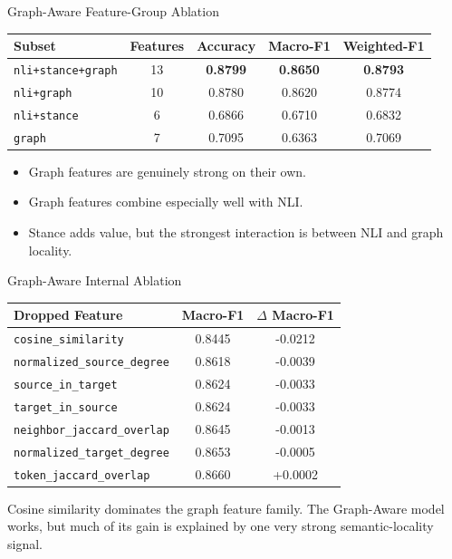 \documentclass[aspectratio=169, 10pt]{beamer}
\newcommand{\takeawaybox}[2]{%
  \begin{tcolorbox}[colback=accentgreen!10, colframe=accentgreen,
    title={\textbf{Takeaway:} #1}, fonttitle=\bfseries\small,
    left=4pt, right=4pt, top=3pt, bottom=3pt, boxrule=1pt]
    \small #2
  \end{tcolorbox}}
\begin{document}
\begin{frame}{Graph-Aware Feature-Group Ablation}
\begin{center}
\begin{tabular}{lcccc}
\toprule
Subset & Features & Accuracy & Macro-F1 & Weighted-F1 \\
\midrule
\texttt{nli+stance+graph} & 13 & \textbf{0.8799} & \textbf{0.8650} & \textbf{0.8793} \\
\texttt{nli+graph} & 10 & 0.8780 & 0.8620 & 0.8774 \\
\texttt{nli+stance} & 6 & 0.6866 & 0.6710 & 0.6832 \\
\texttt{graph} & 7 & 0.7095 & 0.6363 & 0.7069 \\
\bottomrule
\end{tabular}
\end{center}

\begin{itemize}
  \item Graph features are genuinely strong on their own.
  \item Graph features combine especially well with NLI.
  \item Stance adds value, but the strongest interaction is between NLI and graph locality.
\end{itemize}
\end{frame}

\begin{frame}{Graph-Aware Internal Ablation}
\begin{center}
\begin{tabular}{lcc}
\toprule
Dropped Feature & Macro-F1 & \(\Delta\) Macro-F1 \\
\midrule
\texttt{cosine\_similarity} & 0.8445 & -0.0212 \\
\texttt{normalized\_source\_degree} & 0.8618 & -0.0039 \\
\texttt{source\_in\_target} & 0.8624 & -0.0033 \\
\texttt{target\_in\_source} & 0.8624 & -0.0033 \\
\texttt{neighbor\_jaccard\_overlap} & 0.8645 & -0.0013 \\
\texttt{normalized\_target\_degree} & 0.8653 & -0.0005 \\
\texttt{token\_jaccard\_overlap} & 0.8660 & +0.0002 \\
\bottomrule
\end{tabular}
\end{center}

\takeawaybox{Main Finding}{
Cosine similarity dominates the graph feature family. The Graph-Aware model works, but much of its gain is explained by one very strong semantic-locality signal.
}
\end{frame}
\end{document}
